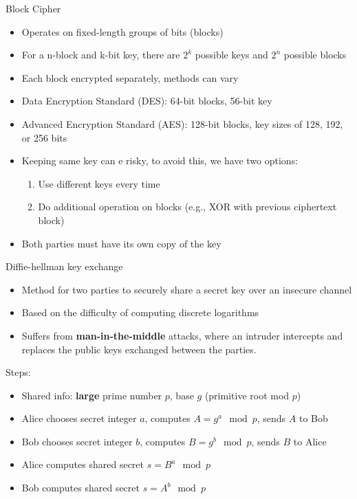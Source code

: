 \begin{knBox}
    {Block Cipher}
    \begin{itemize}
        \item Operates on fixed-length groups of bits (blocks)
        \item For a n-block and k-bit key, there are $2^k$ possible keys and $2^n$ possible blocks
        \item Each block encrypted separately, methods can vary
        \item Data Encryption Standard (DES): 64-bit blocks, 56-bit key
        \item Advanced Encryption Standard (AES): 128-bit blocks, key sizes of 128, 192, or 256 bits
        \item Keeping same key can e risky, to avoid this, we have two options:
              \begin{enumerate}
                  \item Use different keys every time
                  \item Do additional operation on blocks (e.g., XOR with previous ciphertext block)
              \end{enumerate}
        \item Both parties must have its own copy of the key
    \end{itemize}
\end{knBox}

\begin{definition}
    {Diffie-hellman key exchange}
    \begin{itemize}
        \item Method for two parties to securely share a secret key over an insecure channel
        \item Based on the difficulty of computing discrete logarithms
        \item Suffers from \textbf{man-in-the-middle} attacks, where an intruder intercepts and replaces the public keys exchanged between the parties.
    \end{itemize}

    Steps:
    \begin{itemize}
        \item Shared info: \textbf{large} prime number $p$, base $g$ (primitive root mod $p$)
        \item Alice chooses secret integer $a$, computes $A = g^a \mod p$, sends $A$ to Bob
        \item Bob chooses secret integer $b$, computes $B = g^b \mod p$, sends $B$ to Alice
        \item Alice computes shared secret $s = B^a \mod p$
        \item Bob computes shared secret $s = A^b \mod p$
    \end{itemize}
\end{definition}


